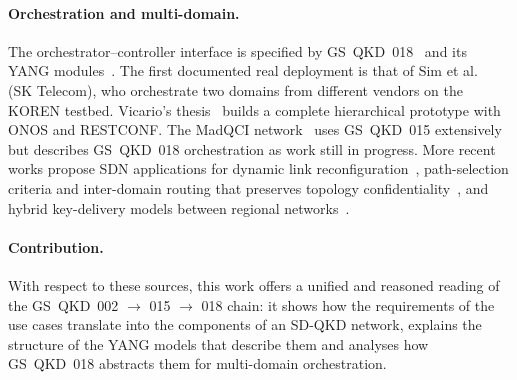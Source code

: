 \paragraph{Orchestration and multi-domain.}
The orchestrator–controller interface is specified by
GS~QKD~018~\cite{qkd018} and its YANG modules~\cite{qkd018yang}. The first
documented real deployment is that of Sim et al.~\cite{sim2023} (SK
Telecom), who orchestrate two domains from different vendors on the KOREN
testbed. Vicario's thesis~\cite{vicario2025} builds a complete hierarchical
prototype with ONOS and RESTCONF. The MadQCI network~\cite{madqci2024} uses
GS~QKD~015 extensively but describes GS~QKD~018 orchestration as work still
in progress. More recent works propose SDN applications for dynamic link
reconfiguration~\cite{mendez2026}, path-selection criteria and inter-domain
routing that preserves topology confidentiality~\cite{laschet2026}, and
hybrid key-delivery models between regional networks~\cite{interconnect2026}.

\paragraph{Contribution.}
With respect to these sources, this work offers a unified and reasoned
reading of the GS~QKD~002 $\to$ 015 $\to$ 018 chain: it shows how the
requirements of the use cases translate into the components of an SD-QKD
network, explains the structure of the YANG models that describe them and
analyses how GS~QKD~018 abstracts them for multi-domain orchestration.
